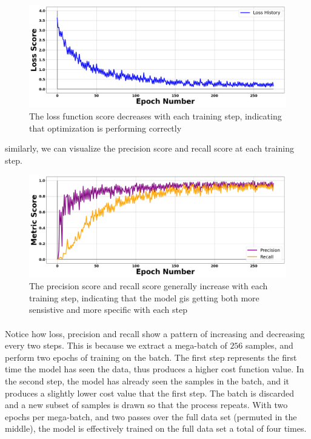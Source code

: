 \documentclass[12pt,letterpaper]{article}
\begin{document}
\begin{figure}[H]
\begin{center}
\includegraphics[scale=0.3]{../Figures/LossHistory}
\end{center}
\caption{The loss function score decreases with each training step, indicating that optimization is performing correctly}
\label{fig-LossScore}
\end{figure}
similarly, we can visualize the precision score and recall score at each training step.
\begin{figure}[H]
\begin{center}
\includegraphics[scale=0.3]{../Figures/MetricHistory}
\end{center}
\caption{The precision score and recall score generally increase with each training step, indicating that the model gis getting both more sensistive and more specific with each step}
\label{fig-PrecisionRecallScores}
\end{figure}

\paragraph*{}Notice how loss, precision and recall show a pattern of increasing and decreasing every two steps. This is because we extract a mega-batch of $256$ samples, and perform two epochs of training on the batch. The first step represents the first time the model has seen the data, thus produces a higher cost function value. In the second step, the model has already seen the samples in the batch, and it produces a slightly lower cost value that the first step. The batch is discarded and a new subset of samples is drawn so that the process repeats. With two epochs per mega-batch, and two passes over the full data set (permuted in the middle), the model is effectively trained on the full data set a total of four times.
\end{document}
